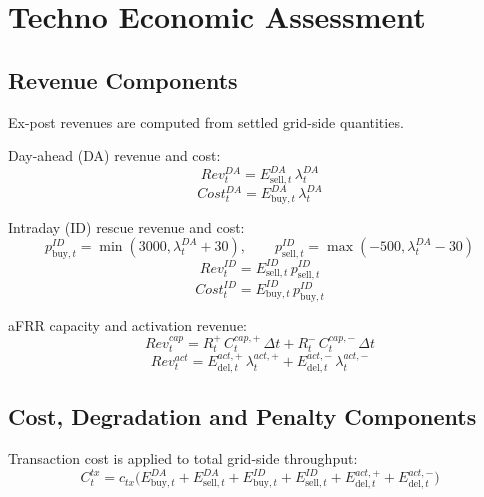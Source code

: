 \section{Techno Economic Assessment}\label{ch:methodology:techno-economic-assessment}
\subsection{Revenue Components}
Ex-post revenues are computed from settled grid-side quantities.

Day-ahead (DA) revenue and cost:
\begin{equation}\label{eq:ta-rev-da}
    Rev^{DA}_t = E^{DA}_{\mathrm{sell},t}\,\lambda^{DA}_t
\end{equation}
\begin{equation}\label{eq:ta-cost-da}
    Cost^{DA}_t = E^{DA}_{\mathrm{buy},t}\,\lambda^{DA}_t
\end{equation}

Intraday (ID) rescue revenue and cost:
\begin{equation}\label{eq:ta-id-prices}
    p^{ID}_{\mathrm{buy},t}=\min\!\left(3000,\lambda^{DA}_t+30\right),
    \qquad
    p^{ID}_{\mathrm{sell},t}=\max\!\left(-500,\lambda^{DA}_t-30\right)
\end{equation}
\begin{equation}\label{eq:ta-rev-id}
    Rev^{ID}_t = E^{ID}_{\mathrm{sell},t}\,p^{ID}_{\mathrm{sell},t}
\end{equation}
\begin{equation}\label{eq:ta-cost-id}
    Cost^{ID}_t = E^{ID}_{\mathrm{buy},t}\,p^{ID}_{\mathrm{buy},t}
\end{equation}

aFRR capacity and activation revenue:
\begin{equation}\label{eq:ta-rev-cap}
    Rev^{cap}_t = R^{+}_{t}\,C^{cap,+}_{t}\,\Delta t + R^{-}_{t}\,C^{cap,-}_{t}\,\Delta t
\end{equation}
\begin{equation}\label{eq:ta-rev-act}
    Rev^{act}_t = E^{act,+}_{\mathrm{del},t}\,\lambda^{act,+}_{t} + E^{act,-}_{\mathrm{del},t}\,\lambda^{act,-}_{t}
\end{equation}
\subsection{Cost, Degradation and Penalty Components}
Transaction cost is applied to total grid-side throughput:
\begin{equation}\label{eq:ta-cost-tx}
    C^{tx}_t
    =
    c_{tx}\Big(
    E^{DA}_{\mathrm{buy},t}+E^{DA}_{\mathrm{sell},t}
    +E^{ID}_{\mathrm{buy},t}+E^{ID}_{\mathrm{sell},t}
    +E^{act,+}_{\mathrm{del},t}+E^{act,-}_{\mathrm{del},t}
    \Big)
\end{equation}

